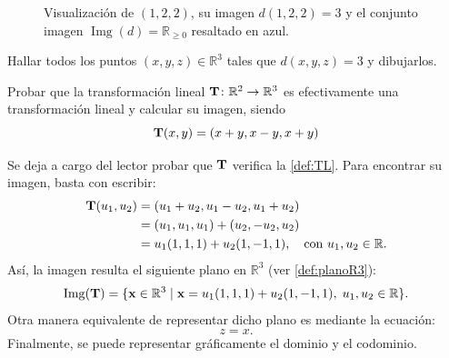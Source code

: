 \begin{figure}[H]
\caption{Visualización de $(1,2,2)$, su imagen $d(1,2,2)=3$ y el conjunto imagen $\operatorname{Img}(d) = \mathbb{R}_{\geq 0}$ resaltado en azul.}
\label{fig:visualizacion_campo_escalar_con_semirrecta}
\end{figure}


\begin{tarea} Hallar todos los puntos $(x,y,z) \in \mathbb{R}^{3}$ tales que  $d(x,y,z)=3$ y dibujarlos. 
\end{tarea}  





\begin{example}
Probar que la transformación lineal $\campoVec{T} \colon \mathbb{R}^2 \to \mathbb{R}^3$ es efectivamente una transformación lineal y calcular su imagen,  siendo $$\campoVec{T}(x,y) = (x+y, x-y, x+y)$$ 
\end{example}

Se deja a cargo del lector probar que $\campoVec{T}$ verifica la \autoref{def:TL}. Para encontrar su imagen, basta con escribir:
\begin{align*}
\campoVec{T}(u_1, u_2) &= (u_1+u_2, u_1-u_2, u_1+u_2) \\
&= (u_1, u_1, u_1) + (u_2, -u_2, u_2) \\
&= u_1(1,1,1) + u_2(1,-1,1), \quad \text{con } u_1, u_2 \in \mathbb{R}.
\end{align*}
Así, la imagen resulta el siguiente plano en $\mathbb{R}^3$ (ver \autoref{def:planoR3}):
\begin{equation*}
\operatorname{Img}(\campoVec{T}) = \{ \vect{x} \in \mathbb{R}^3 \mid \vect{x} = u_1(1,1,1) + u_2(1,-1,1), \; u_1, u_2 \in \mathbb{R} \}.
\end{equation*}
Otra manera equivalente de representar dicho plano es mediante la ecuación:
\[ z = x.\]Finalmente, se puede representar gráficamente el dominio y el codominio.


